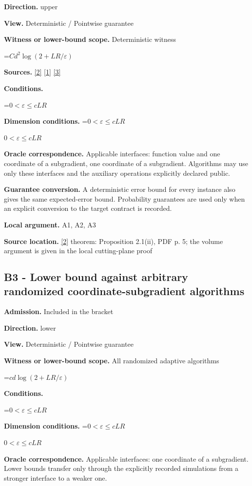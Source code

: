 \documentclass[10pt,a4paper]{article}
\newcommand{\AtlasMath}[1]{\par\begingroup\centering\setbox0=\hbox{$\displaystyle #1$}\ifdim\wd0>1.4\linewidth\typeout{ATLAS WIDE FORMULA: \the\wd0}\fi\ifdim\wd0>\linewidth\resizebox{\linewidth}{!}{\box0}\else\box0\fi\par\endgroup}
\newcommand{\AtlasInlineMath}[1]{\begingroup\setbox0=\hbox{$#1$}\ifdim\wd0>.4\linewidth\endgroup\AtlasMath{#1}\else\endgroup$#1$\fi}
\begin{document}
\textbf{Direction.} upper

\textbf{View.} Deterministic / Pointwise guarantee

\textbf{Witness or lower-bound scope.} Deterministic witness

\AtlasMath{Cd^2\log(2+LR/\varepsilon)}
\textbf{Sources.} \href{https://www2.isye.gatech.edu/~nemirovs/MOR_AccuracyCertificates.pdf}{[2]} \href{https://arxiv.org/pdf/1405.4980}{[1]} \href{https://arxiv.org/pdf/2609.20701}{[3]}

\textbf{Conditions.} 
\AtlasMath{0<\varepsilon\le cLR}


\textbf{Dimension conditions.} \AtlasInlineMath{0<\varepsilon\le cLR}

\textbf{Oracle correspondence.} Applicable interfaces: function value and one coordinate of a subgradient, one coordinate of a subgradient. Algorithms may use only these interfaces and the auxiliary operations explicitly declared public.

\textbf{Guarantee conversion.} A deterministic error bound for every instance also gives the same expected-error bound. Probability guarantees are used only when an explicit conversion to the target contract is recorded.

\textbf{Local argument.} A1, A2, A3

\textbf{Source location.} \href{https://www2.isye.gatech.edu/~nemirovs/MOR_AccuracyCertificates.pdf}{[2]} theorem: Proposition 2.1(ii), PDF p. 5; the volume argument is given in the local cutting-plane proof

\subsection{B3 - Lower bound against arbitrary randomized coordinate-subgradient algorithms}
\textbf{Admission.} Included in the bracket

\textbf{Direction.} lower

\textbf{View.} Deterministic / Pointwise guarantee

\textbf{Witness or lower-bound scope.} All randomized adaptive algorithms

\AtlasMath{cd\log(2+LR/\varepsilon)}
\textbf{Conditions.} 
\AtlasMath{0<\varepsilon\le cLR}


\textbf{Dimension conditions.} \AtlasInlineMath{0<\varepsilon\le cLR}

\textbf{Oracle correspondence.} Applicable interfaces: one coordinate of a subgradient. Lower bounds transfer only through the explicitly recorded simulations from a stronger interface to a weaker one.
\end{document}
